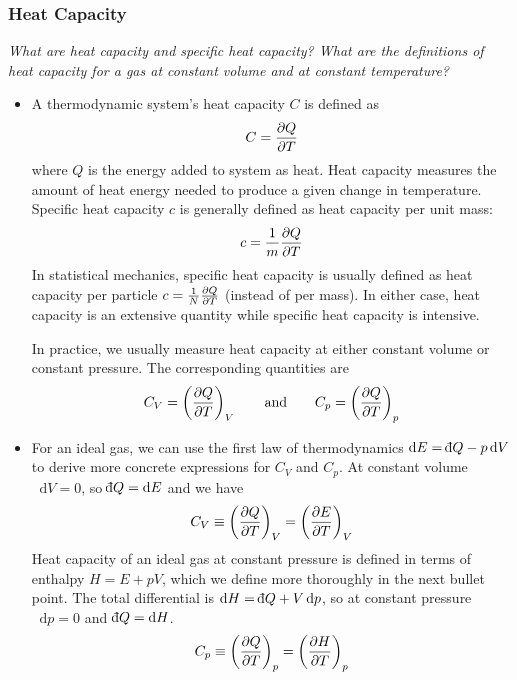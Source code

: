 \documentclass[11pt, a4paper]{article}
\newcommand{\eqtext}[1]{\qquad \text{#1} \qquad}
\newcommand{\diff}{\mathop{}\!\mathrm{d}} %
\newcommand{\dbar}{{\mathchar '26\mkern -11mu \mathrm{d}}} %
\newcommand{\pdveval}[3]{\left(\pdv{#1}{#2}\right)_{#3}}
\begin{document}
\subsubsection{Heat Capacity}
\textit{What are heat capacity and specific heat capacity? What are the definitions of heat capacity for a gas at constant volume and at constant temperature? }
\begin{itemize}
	\item A thermodynamic system's heat capacity $ C $ is defined as
	\begin{equation*}
		C = \pdv{Q}{T}
	\end{equation*}
	where $ Q $ is the energy added to system as heat. Heat capacity measures the amount of heat energy needed to produce a given change in temperature. Specific heat capacity $ c $ is generally defined as heat capacity per unit mass:
	\begin{equation*}
		c = \frac{1}{m}\pdv{Q}{T}
	\end{equation*}
	In statistical mechanics, specific heat capacity is usually defined as heat capacity per particle $ c = \frac{1}{N}\pdv{Q}{T} $ (instead of per mass). In either case, heat capacity is an extensive quantity while specific heat capacity is intensive.
	
	In practice, we usually measure heat capacity at either constant volume or constant pressure. The corresponding quantities are
	\begin{equation*}
		C_{V} = \pdveval{Q}{T}{V} \eqtext{and} C_{p} = \pdveval{Q}{T}{p}
	\end{equation*}
	
	\item For an ideal gas, we can use the first law of thermodynamics $ \diff E = \dbar Q - p \diff V $ to derive more concrete expressions for $ C_{V} $ and $ C_{p} $. At constant volume $ \diff V = 0 $, so $ \dbar Q = \diff E $ and we have
	\begin{equation*}
		C_{V} \equiv \pdveval{Q}{T}{V} = \pdveval{E}{T}{V}
	\end{equation*}
	Heat capacity of an ideal gas at constant pressure is defined in terms of enthalpy $ H = E + pV $, which we define more thoroughly in the next bullet point. The total differential is $ \diff H = \dbar Q + V \diff p $, so at constant pressure $ \diff p = 0 $ and $ \dbar Q = \diff H $. 
	\begin{equation*}
		C_{p} \equiv \pdveval{Q}{T}{p} = \pdveval{H}{T}{p}
	\end{equation*}
	

\end{itemize}
\end{document}
